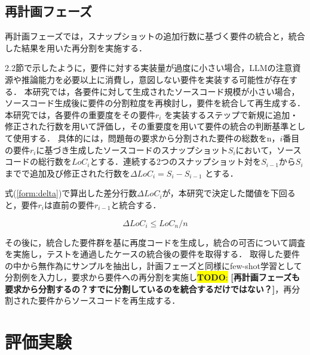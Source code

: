 \documentclass[submit,techrep,noauthor]{ipsj}
\newcommand{\todo}[1]{\colorbox{yellow}{{\bf TODO}:}{\color{red} {\textbf{[#1]}}}}
\begin{document}
\subsection{再計画フェーズ}
再計画フェーズでは，スナップショットの追加行数に基づく要件の統合と，統合した結果を用いた再分割を実施する．

2.2節で示したように，要件に対する実装量が過度に小さい場合，LLMの注意資源や推論能力を必要以上に消費し，意図しない要件を実装する可能性が存在する\cite{tosem}．
本研究では，各要件に対して生成されたソースコード規模が小さい場合，ソースコード生成後に要件の分割粒度を再検討し，要件を統合して再生成する．
本研究では，各要件の重要度をその要件$r_i$ を実装するステップで新規に追加・修正された行数を用いて評価し，その重要度を用いて要件の統合の判断基準として使用する．
具体的には，問題毎の要求から分割された要件の総数をn，$i$番目の要件$r_i$に基づき生成したソースコードのスナップショット$S_i$において，ソースコードの総行数を$LoC_i$とする．連続する2つのスナップショット対を$S_{i-1}$から$S_i$までで追加及び修正された行数を$\Delta LoC_i = S_i - S_{i-1}$ とする．

式(\ref{form:delta})で算出した差分行数$\Delta LoC_i$が，本研究で決定した閾値を下回ると，要件$r_i$は直前の要件$r_{i-1}$と統合する．

\begin{equation}\label{form:delta}
    \Delta LoC_i \leq LoC_n / n
\end{equation}

その後に，統合した要件群を基に再度コードを生成し，統合の可否について調査を実施し，テストを通過したケースの統合後の要件を取得する．
取得した要件の中から無作為にサンプルを抽出し，計画フェーズと同様にfew-shot学習として分割例を入力し，要求から要件への再分割を実施し\todo{再計画フェーズも要求から分割するの？すでに分割しているのを統合するだけではない？}，再分割された要件からソースコードを再生成する．



\section{評価実験}
\label{sec:evaluation}

\end{document}
